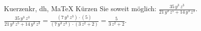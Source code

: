 \begin{MAufgabe}{Kuerzen}{kr, dh, MaTeX}
K\"urzen Sie soweit m\"oglich: $\frac{35\, y^3\, z^3}{21\, y^3\, z^5 + 14\, y^3\, z^3}$.\\ 
\ifLsg\MLoesung
\quad $\frac{35\, y^3\, z^3}{21\, y^3\, z^5 + 14\, y^3\, z^3}=\frac{(7\, y^3\, z^3)\cdot(5)}{(7\, y^3\, z^3)\cdot(3\, z^2 + 2)}=\frac{5}{3\, z^2 + 2}$.\else\relax\fi
 \end{MAufgabe}